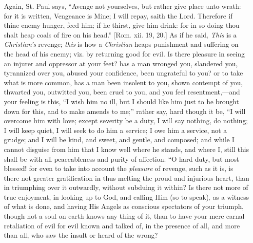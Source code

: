 Again, St. Paul says, ``Avenge not yourselves, but rather give
place unto wrath: for it is written, Vengeance is Mine; I will repay,
saith the Lord. Therefore if thine enemy hunger, feed him; if he
thirst, give him drink: for in so doing thou shalt heap coals of fire
on his head.'' [Rom. xii. 19, 20.] As if he said, \emph{This} is a
\emph{Christian's} revenge; \emph{this} is how a \emph{Christian}
heaps punishment and suffering on the head of his enemy; viz. by
returning good for evil. Is there pleasure in seeing an injurer and
oppressor at your feet? has a man wronged you, slandered you,
tyrannized over you, abused your confidence, been ungrateful to you?
or to take what is more common, has a man been insolent to you, shown
contempt of you, thwarted you, outwitted you, been cruel to you, and
you feel resentment,—and your feeling is this, ``I wish him no
ill, but I should like him just to be brought down for this, and to
make amends to me;'' rather say, hard though it be, ``I will
overcome him with love; except severity be a duty, I will say nothing,
do nothing; I will keep quiet, I will seek to do him a service; I owe
him a service, not a grudge; and I will be kind, and sweet, and
gentle, and composed; and while I cannot disguise from him that I know
well where he stands, and where I, still this shall be with all
peaceableness and purity of affection. ``O hard duty, but most
blessed! for even to take into account the \emph{pleasure} of revenge,
such as it is, is there not greater gratification in thus melting the
proud and injurious heart, than in triumphing over it outwardly,
without subduing it within? Is there not more of true enjoyment, in
looking up to God, and calling Him (so to speak), as a witness of what
is done, and having His Angels as conscious spectators of your
triumph, though not a soul on earth knows any thing of it, than to
have your mere carnal retaliation of evil for evil known and talked
of, in the presence of all, and more than all, who saw the insult or
heard of the wrong?


